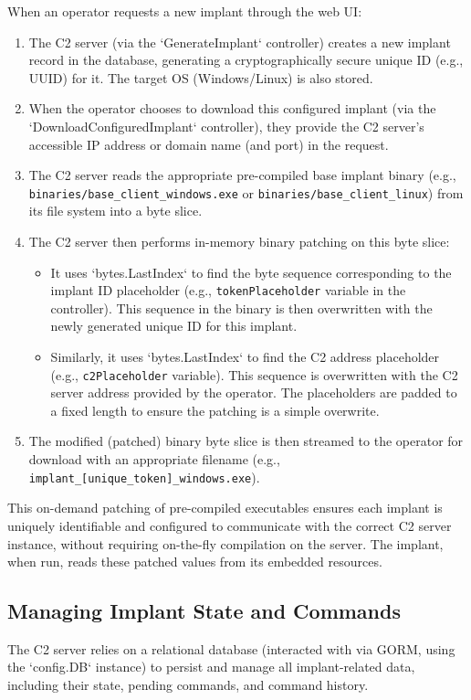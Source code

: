 When an operator requests a new implant through the web UI:
\begin{enumerate}
    \item The C2 server (via the `GenerateImplant` controller) creates a new implant record in the database, generating a cryptographically secure unique ID (e.g., UUID) for it. The target OS (Windows/Linux) is also stored.
    \item When the operator chooses to download this configured implant (via the `DownloadConfiguredImplant` controller), they provide the C2 server's accessible IP address or domain name (and port) in the request.
    \item The C2 server reads the appropriate pre-compiled base implant binary (e.g., \texttt{binaries/base\_client\_windows.exe} or \texttt{binaries/base\_client\_linux}) from its file system into a byte slice.
    \item The C2 server then performs in-memory binary patching on this byte slice:
        \begin{itemize}
            \item It uses `bytes.LastIndex` to find the byte sequence corresponding to the implant ID placeholder (e.g., \texttt{tokenPlaceholder} variable in the controller). This sequence in the binary is then overwritten with the newly generated unique ID for this implant.
            \item Similarly, it uses `bytes.LastIndex` to find the C2 address placeholder (e.g., \texttt{c2Placeholder} variable). This sequence is overwritten with the C2 server address provided by the operator. The placeholders are padded to a fixed length to ensure the patching is a simple overwrite.
        \end{itemize}
    \item The modified (patched) binary byte slice is then streamed to the operator for download with an appropriate filename (e.g., \texttt{implant\_[unique\_token]\_windows.exe}).
\end{enumerate}
This on-demand patching of pre-compiled executables ensures each implant is uniquely identifiable and configured to communicate with the correct C2 server instance, without requiring on-the-fly compilation on the server. The implant, when run, reads these patched values from its embedded resources.

\subsection{Managing Implant State and Commands}
The C2 server relies on a relational database (interacted with via GORM, using the `config.DB` instance) to persist and manage all implant-related data, including their state, pending commands, and command history.

